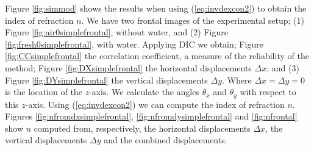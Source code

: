 \documentclass{svjour3}                     %
\begin{document}
Figure \ref{fig:simmod} shows the results when using (\ref{eq:invdexcon2}) to obtain the index of refraction $n$. We have two frontal images of the experimental setup; (1) Figure \ref{fig:air0simplefrontal}, without water, and (2) Figure \ref{fig:fresh0simplefrontal}, with water.  Applying DIC we obtain; Figure \ref{fig:CCsimplefrontal} the correlation coefficient, a measure of the reliability of the method; Figure \ref{fig:DXsimplefrontal} the horizontal displacements $\Delta x$; and (3) Figure \ref{fig:DYsimplefrontal} the vertical displacements $\Delta y$. Where $\Delta x = \Delta y = 0$ is the location of the $z$-axis. We calculate the angles $\theta_x$ and $\theta_y$ with respect to this $z$-axis. Using (\ref{eq:invdexcon2}) we can compute the index of refraction $n$. Figures \ref{fig:nfromdxsimplefrontal}, \ref{fig:nfromdysimplefrontal} and \ref{fig:nfrontal} show $n$ computed from, respectively, the horizontal displacements $\Delta x$, the vertical displacements $\Delta y$ and the combined displacements.
\end{document}
